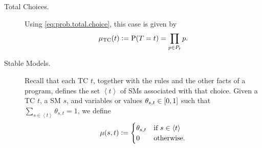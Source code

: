 \documentclass{llncs}
\newcommand{\at}[1]{\ensuremath{\!\del{#1}}}
\newcommand{\pr}[1]{\ensuremath{\mathrm{P}\at{#1}}}
\newcommand{\pw}[1]{\ensuremath{\mu\at{#1}}}
\newcommand{\pwcfname}{\ensuremath{\mu_{\textrm{TC}}}}
\newcommand{\pwc}[1]{\ensuremath{\pwcfname\at{#1}}}
\newcommand{\tcgen}[1]{\ensuremath{\left<#1\right>}}
\begin{document}
\begin{description}
    \item[Total Choices.] Using \cref{eq:prob.total.choice}, this case is given by
          \begin{equation}
              \pwc{t} := \pr{T = t}= \prod_{p\in P_t} p.
              \label{eq:measure.tchoice}
          \end{equation}

    \item[Stable Models.] Recall that each \acl{TC} $t$, together with the rules and the other facts of a program, defines the set \tcgen{t} of \aclp{SM} associated with that choice.
            Given a \acl{TC} $t$, a \acl{SM} $s$, and variables or values $\theta_{s,t} \in \intcc{0, 1}$ such that $\sum_{s\in \tcgen{t}} \theta_{s,t} = 1$, we define
          \begin{equation}
              \pw{s, t} := \begin{cases}
                  \theta_{s,t} & \text{if~} s \in \tcgen{t}\cr
                  0            & \text{otherwise.}
              \end{cases}
              \label{eq:measure.stablemodel}
          \end{equation}



\end{description}
\end{document}
